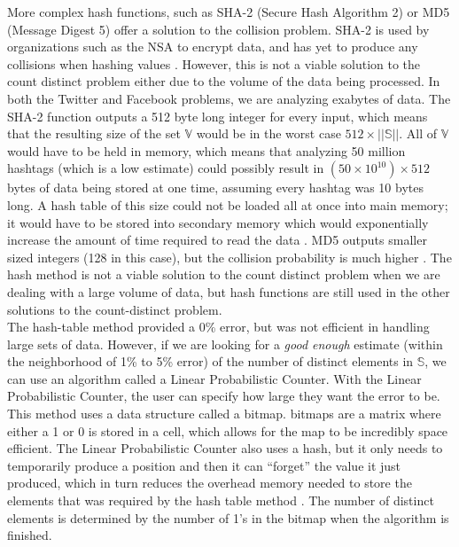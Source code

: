 \documentclass{article}
\begin{document}
\indent More complex hash functions, such as SHA-2 (Secure Hash Algorithm 2) or MD5 (Message Digest 5) offer a solution to the collision problem. SHA-2 is used by organizations such as the NSA to encrypt data, and has yet to produce any collisions when hashing values \cite[p. 301]{SHA-Algo}. However, this is not a viable solution to the count distinct problem either due to the volume of the data being processed. In both the Twitter and Facebook problems, we are analyzing exabytes of data. The SHA-2 function outputs a 512 byte long integer for every input, which means that the resulting size of the set $\mathbb{V}$ would be in the worst case $512 \times ||\mathbb{S}||$. All of $\mathbb{V}$ would have to be held in memory, which means that analyzing 50 million hashtags (which is a low estimate)\cite{Twitter} could possibly result in $(50 \times 10^{10}) \times 512$ bytes of data being stored at one time, assuming every hashtag was 10 bytes long. A hash table of this size could not be loaded all at once into main memory; it would have to be stored into secondary memory which would exponentially increase the amount of time required to read the data \cite[p. 209]{Whang}. MD5 outputs smaller sized integers (128 in this case), but the collision probability is much higher \cite[p. 22 - 23]{Break-MD5}. The hash method is not a viable solution to the count distinct problem when we are dealing with a large volume of data, but hash functions are still used in the other solutions to the count-distinct problem.\\
\indent The hash-table method provided a 0\% error, but was not efficient in handling large sets of data. However, if we are looking for a \textit{good enough} estimate (within the neighborhood of 1\% to 5\% error) of the number of distinct elements in $\mathbb{S}$, we can use an algorithm called a Linear Probabilistic Counter. With the Linear Probabilistic Counter, the user can specify how large they want the error to be. This method uses a data structure called a bitmap. bitmaps are a matrix where either a 1 or 0 is stored in a cell, which allows for the map to be incredibly space efficient. The Linear Probabilistic Counter also uses a hash, but it only needs to temporarily produce a position and then it can ``forget'' the value it just produced, which in turn reduces the overhead memory needed to store the elements that was required by the hash table method \cite{Whang}. The number of distinct elements is determined by the number of 1's in the bitmap when the algorithm is finished.\\
\end{document}
